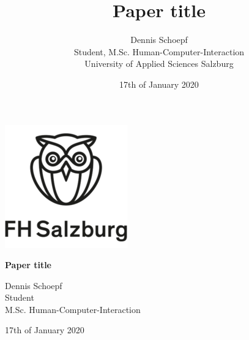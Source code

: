 \documentclass[11pt]{article}
\title{Paper title}
\date{17th of January 2020}
\author{Dennis Schoepf\\ Student, M.Sc. Human-Computer-Interaction\\ University of Applied Sciences Salzburg}
\begin{document}
  \begin{titlepage}
    \centering
    \includegraphics[totalheight=3cm]{images/fhsalzburg.png}\par
    \vspace{1cm}
    {\huge\bfseries Paper title\par}
    \vspace{0.5cm}
    {Dennis Schoepf\\ Student\\ M.Sc. Human-Computer-Interaction \par}
    \vfill
    {\large 17th of January 2020\par}
  \end{titlepage}

  

  
  
\end{document}
